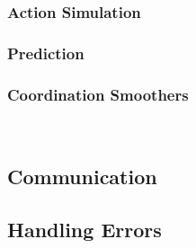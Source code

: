 \documentclass[a4paper,11pt,twoside]{StyleThese}
\begin{document}
\subsubsection{Action Simulation}


\subsubsection{Prediction}

\subsubsection{Coordination Smoothers}~\label{chap1:subsubsec:coord_smooth}



%
%

\subsection{Communication}

\subsection{Handling Errors}
\end{document}
